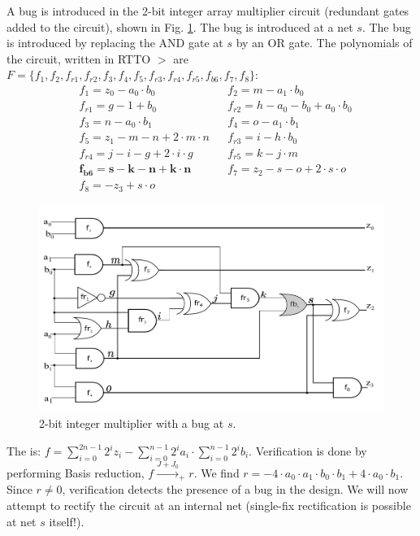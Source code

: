 \begin{Example}
A bug is introduced in the 2-bit integer array multiplier circuit
(redundant gates added to the circuit), shown in Fig. \ref{fig:3mult}. The
bug is introduced at a net $s$. The bug is introduced by replacing
the AND gate at $s$ by an OR gate. The polynomials of the circuit,
written in RTTO $>$ are $F = \{f_1, f_2, f_{r1}, f_{r2}, f_3, f_4, f_5,
f_{r3}, f_{r4}, f_{r5}, f_{b6}, f_7, f_8\}$: 
{\small
\begin{align*}
& f_1 = z_0-a_0\cdot b_0 && f_2 = m-a_1\cdot b_0 \\
& f_{r1} = g-1+b_0 && f_{r2} = h-a_0-b_0 + a_0\cdot b_0 \\
& f_3 = n-a_0\cdot b_1 && f_4 = o-a_1\cdot b_1 \\
& f_5 = z_1-m-n+2\cdot m \cdot n && f_{r3} = i-h \cdot b_0 \\
& f_{r4} = j-i-g+2 \cdot i \cdot g && f_{r5} = k-j \cdot m \\
& \mathbf{f_{b6} = s-k- n+k\cdot n} && f_7 = z_2-s-o+2\cdot s \cdot o \\
& f_8 = -z_3+s\cdot o 
\end{align*}
}
\vspace{-0.2in}

\begin{figure}[hbt]
    \centering
    \includegraphics[scale = 0.2]{int_mul_red_b.png}
    \caption{2-bit integer multiplier with a bug at $s$.}
    \label{fig:3mult}
\end{figure}

The \spec is: $f = \sum_{i=0}^{2n-1}
2^iz_i-\sum_{i=0}^{n-1} 2^ia_i\cdot \sum_{i=0}^{n-1} 2^ib_i$.
Verification is done by performing \Grobner Basis reduction, $f
\xrightarrow{J+J_0}_+r$. We find $r = -4\cdot a_0\cdot a_1\cdot
b_0\cdot b_1+4\cdot a_0\cdot b_1$. Since $r \neq 0$, verification
detects the presence of a bug in the design. We will now attempt to
rectify the circuit at an internal net (single-fix
rectification is possible at net $s$ itself!). 
\end{Example}
